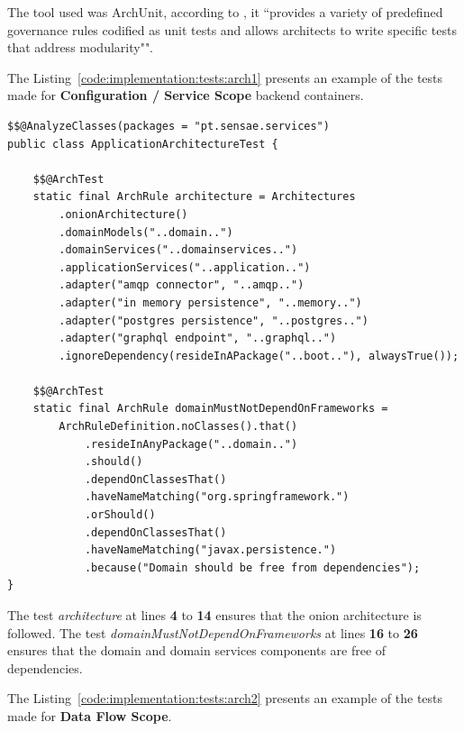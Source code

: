The tool used was ArchUnit, according to \cite{archunit}, it ``provides a variety of predefined governance rules codified as unit tests and allows architects to write specific tests that address modularity"".

The Listing~\ref{code:implementation:tests:arch1} presents an example of the tests made for \textbf{Configuration / Service Scope} backend containers.

\begin{lstlisting}[style=Java, caption=Architectural Test - Onion Architecture - \textbf{Device Management Master Backend}, label={code:implementation:tests:arch1}]
$$@AnalyzeClasses(packages = "pt.sensae.services")
public class ApplicationArchitectureTest {

    $$@ArchTest
    static final ArchRule architecture = Architectures
        .onionArchitecture()
        .domainModels("..domain..")
        .domainServices("..domainservices..")
        .applicationServices("..application..")
        .adapter("amqp connector", "..amqp..")
        .adapter("in memory persistence", "..memory..")
        .adapter("postgres persistence", "..postgres..")
        .adapter("graphql endpoint", "..graphql..")
        .ignoreDependency(resideInAPackage("..boot.."), alwaysTrue());

    $$@ArchTest
    static final ArchRule domainMustNotDependOnFrameworks = 
        ArchRuleDefinition.noClasses().that()
            .resideInAnyPackage("..domain..")
            .should()
            .dependOnClassesThat()
            .haveNameMatching("org.springframework.")
            .orShould()
            .dependOnClassesThat()
            .haveNameMatching("javax.persistence.")
            .because("Domain should be free from dependencies");
}
\end{lstlisting}

The test \textit{architecture} at lines \textbf{4} to \textbf{14} ensures that the onion architecture is followed. The test \textit{domainMustNotDependOnFrameworks} at lines \textbf{16} to \textbf{26} ensures that the domain and domain services components are free of dependencies.

The Listing~\ref{code:implementation:tests:arch2} presents an example of the tests made for \textbf{Data Flow Scope}.


